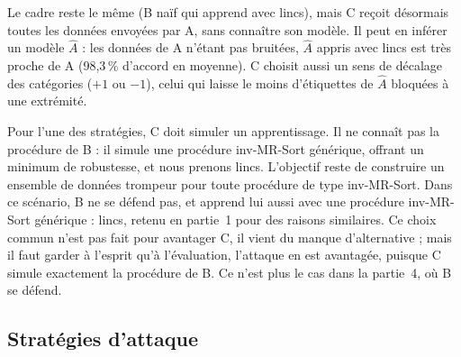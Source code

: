 \documentclass[11pt,a4paper]{article}
\begin{document}
Le cadre reste le même (B naïf qui apprend avec lincs), mais C reçoit désormais
toutes les données envoyées par A, sans connaître son modèle. Il peut en inférer un modèle $\hat{A}$ : les
données de A n'étant pas bruitées, $\hat{A}$ appris avec lincs est très proche de A (98,3\,\% d'accord en
moyenne). C choisit aussi un sens de décalage des catégories ($+1$ ou $-1$), celui qui laisse le moins
d'étiquettes de $\hat{A}$ bloquées à une extrémité.

Pour l'une des stratégies, C doit simuler un apprentissage. Il ne connaît pas la procédure de B : il simule une
procédure inv-MR-Sort générique, offrant un minimum de robustesse, et nous prenons lincs. L'objectif reste de
construire un ensemble de données trompeur pour toute procédure de type inv-MR-Sort. Dans ce scénario, B ne se
défend pas, et apprend lui aussi avec une procédure inv-MR-Sort générique : lincs, retenu en partie~1 pour des
raisons similaires. Ce choix commun n'est pas fait pour avantager C, il vient du manque d'alternative ; mais il
faut garder à l'esprit qu'à l'évaluation, l'attaque en est avantagée, puisque C simule exactement la procédure de
B. Ce n'est plus le cas dans la partie~4, où B se défend.

\subsection{Stratégies d'attaque}
\end{document}
